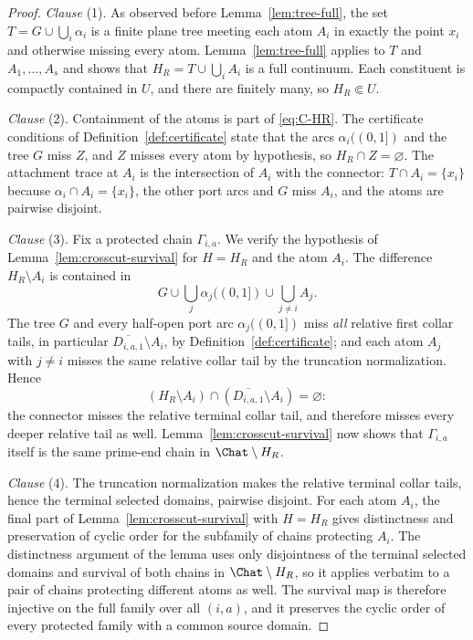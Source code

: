 \begin{proof}
\emph{Clause} (1).  As observed before Lemma~\ref{lem:tree-full}, the set
$T=G\cup\bigcup_i\alpha_i$ is a finite plane tree meeting each atom $A_i$
in exactly the point $x_i$ and otherwise missing every atom.
Lemma~\ref{lem:tree-full} applies to $T$ and $A_1,\dots,A_s$ and shows
that $H_R=T\cup\bigcup_iA_i$ is a full continuum.  Each constituent is
compactly contained in $U$, and there are finitely many, so
$H_R\Subset U$.

\emph{Clause} (2).  Containment of the atoms is part of
\eqref{eq:C-HR}.  The certificate conditions of
Definition~\ref{def:certificate} state that the arcs
$\alpha_i((0,1])$ and the tree $G$ miss $Z$, and $Z$ misses every atom by
hypothesis, so $H_R\cap Z=\varnothing$.  The attachment trace at $A_i$ is
the intersection of $A_i$ with the connector: $T\cap A_i=\{x_i\}$ because
$\alpha_i\cap A_i=\{x_i\}$, the other port arcs and $G$ miss $A_i$, and
the atoms are pairwise disjoint.

\emph{Clause} (3).  Fix a protected chain $\Gamma_{i,a}$.  We verify the
hypothesis of Lemma~\ref{lem:crosscut-survival} for $H=H_R$ and the atom
$A_i$.  The difference $H_R\setminus A_i$ is contained in
\[
G\cup\bigcup_j\alpha_j((0,1])\cup\bigcup_{j\ne i}A_j .
\]
The tree $G$ and every half-open port arc $\alpha_j((0,1])$ miss
\emph{all} relative first collar tails, in particular
$\overline{D_{i,a,1}}\setminus A_i$, by
Definition~\ref{def:certificate}; and each atom $A_j$ with $j\ne i$
misses the same relative collar tail by the truncation
normalization.  Hence
\[
(H_R\setminus A_i)\cap
(\overline{D_{i,a,1}}\setminus A_i)=\varnothing:
\]
the connector misses the relative terminal collar tail, and therefore
misses every deeper relative tail as well.
Lemma~\ref{lem:crosscut-survival} now shows that
$\Gamma_{i,a}$ itself is the same prime-end chain in
$\Chat\setminus H_R$.

\emph{Clause} (4).  The truncation normalization makes the relative
terminal collar tails, hence the terminal selected domains, pairwise
disjoint.  For
each atom $A_i$, the final part of Lemma~\ref{lem:crosscut-survival}
with $H=H_R$ gives distinctness and preservation of cyclic order for the
subfamily of chains protecting $A_i$.  The distinctness argument of the
lemma uses only disjointness of the terminal selected domains and
survival of both chains in $\Chat\setminus H_R$, so it applies verbatim
to a pair of chains protecting different atoms as well.  The survival
map is therefore injective on the full family over all $(i,a)$, and it
preserves the cyclic order of every protected family with a common
source domain.


\end{proof}
